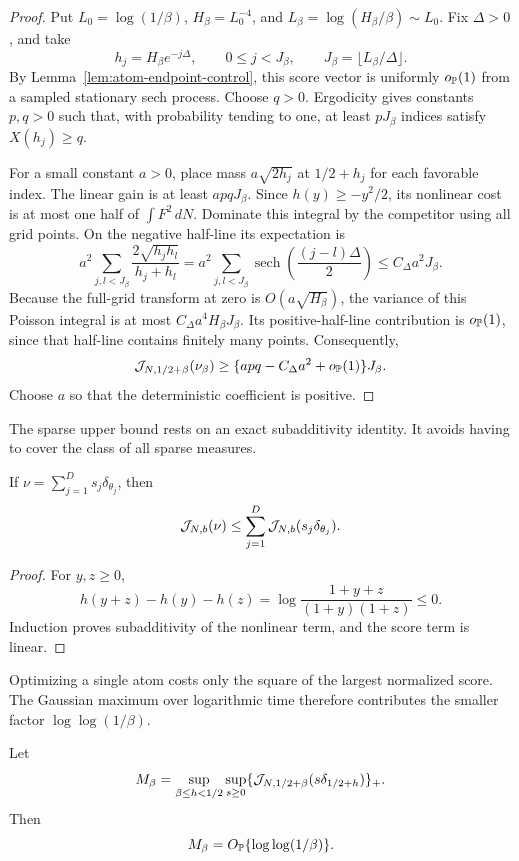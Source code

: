 \begin{proof}
Put \(L_0=\log(1/\beta)\), \(H_\beta=L_0^{-4}\), and
\(L_\beta=\log(H_\beta/\beta)\sim L_0\). Fix \(\Delta>0\), and take
\[
    h_j=H_\beta e^{-j\Delta},
    \qquad 0\le j<J_\beta,
    \qquad J_\beta=\lfloor L_\beta/\Delta\rfloor.
\]
By Lemma~\ref{lem:atom-endpoint-control}, this score vector is uniformly
\(o_{\mathbb{P}}(1)\) from a sampled stationary sech process. Choose \(q>0\).
Ergodicity gives constants \(p,q>0\) such that, with probability tending to
one, at least \(pJ_\beta\) indices satisfy \(X(h_j)\ge q\).

For a small constant \(a>0\), place mass \(a\sqrt{2h_j}\) at
\(1/2+h_j\) for each favorable index. The linear gain is at least
\(apqJ_\beta\). Since \(h(y)\ge-y^2/2\), its nonlinear cost is at most one
half of \(\int F^2\,dN\). Dominate this integral by the competitor using all
grid points. On the negative half-line its expectation is
\[
 a^2\sum_{j,l<J_\beta}\frac{2\sqrt{h_jh_l}}{h_j+h_l}
 =a^2\sum_{j,l<J_\beta}
    \operatorname{sech}\left(\frac{(j-l)\Delta}{2}\right)
 \le C_\Delta a^2J_\beta.
\]
Because the full-grid transform at zero is \(O(a\sqrt{H_\beta})\), the
variance of this Poisson integral is at most
\(C_\Delta a^4H_\beta J_\beta\). Its positive-half-line contribution is
\(o_{\mathbb{P}}(1)\), since that half-line contains finitely many points.
Consequently,
\[
    \mathcal J_{N,1/2+\beta}(\nu_\beta)
    \ge\{apq-C_\Delta a^2+o_{\mathbb{P}}(1)\}J_\beta.
\]
Choose \(a\) so that the deterministic coefficient is positive.
\end{proof}

The sparse upper bound rests on an exact subadditivity identity. It avoids
having to cover the class of all sparse measures.
\begin{lemma}
\label{lem:atom-gain-subadditivity}
If \(\nu=\sum_{j=1}^Ds_j\delta_{\theta_j}\), then
\[
    \mathcal J_{N,b}(\nu)
    \le\sum_{j=1}^D\mathcal J_{N,b}(s_j\delta_{\theta_j}).
\]
\end{lemma}

\begin{proof}
For \(y,z\ge0\),
\[
 h(y+z)-h(y)-h(z)
 =\log\frac{1+y+z}{(1+y)(1+z)}\le0.
\]
Induction proves subadditivity of the nonlinear term, and the score term is
linear. \qedhere
\end{proof}

Optimizing a single atom costs only the square of the largest normalized
score. The Gaussian maximum over logarithmic time therefore contributes the
smaller factor \(\log\log(1/\beta)\).
\begin{proposition}
\label{prop:atom-one-gain}
Let
\[
    M_\beta=
    \sup_{\beta\le h<1/2}\sup_{s\ge0}
       \{\mathcal J_{N,1/2+\beta}(s\delta_{1/2+h})\}_+.
\]
Then
\[
    M_\beta=O_{\mathbb{P}}\{\log\log(1/\beta)\}.
\]
\end{proposition}

